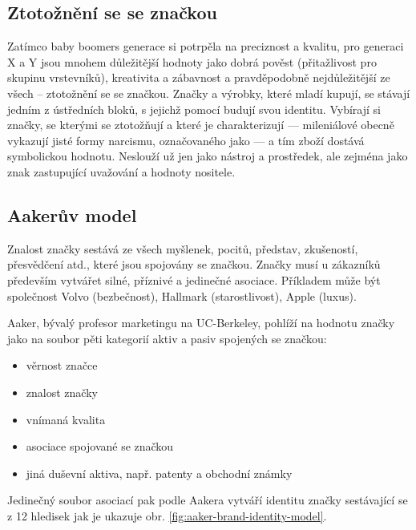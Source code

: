 \subsection{Ztotožnění se se značkou}

Zatímco baby boomers generace si potrpěla na preciznost a kvalitu, pro generaci X a Y jsou mnohem důležitější hodnoty jako dobrá pověst (přitažlivost pro skupinu vrstevníků), kreativita a zábavnost a pravděpodobně nejdůležitější ze všech -- ztotožnění se se značkou. Značky a výrobky, které mladí kupují, se stávají jedním z ústředních bloků, s jejichž pomocí budují svou identitu. Vybírají si značky, se kterými se ztotožňují a které je charakterizují --- mileniálové obecně vykazují jisté formy narcismu, označovaného jako  --- a tím zboží dostává symbolickou hodnotu. Neslouží už jen jako nástroj a prostředek, ale zejména jako znak zastupující uvažování a hodnoty nositele.\cite{bergh2012coolznacky}

\subsection{Aakerův model}
Znalost značky sestává ze všech myšlenek, pocitů, představ, zkušeností, přesvědčení atd., které jsou spojovány se značkou. Značky musí u zákazníků především vytvářet silné, příznivé a jedinečné asociace.\cite[s. 315]{kotler2007marketingmanagement}
Příkladem může být společnost Volvo (bezbečnost), Hallmark (starostlivost), Apple (luxus).

Aaker, bývalý profesor marketingu na UC-Berkeley, pohlíží na hodnotu značky jako na soubor pěti kategorií aktiv a pasiv spojených se značkou\cite{kotler2007marketingmanagement}:
\begin{itemize}
    \item věrnost značce
    \item znalost značky
    \item vnímaná kvalita
    \item asociace spojované se značkou
    \item jiná duševní aktiva, např. patenty a obchodní známky
\end{itemize}

Jedinečný soubor asociací pak podle Aakera vytváří identitu značky sestávající se z 12 hledisek jak je ukazuje obr. \ref{fig:aaker-brand-identity-model}.

